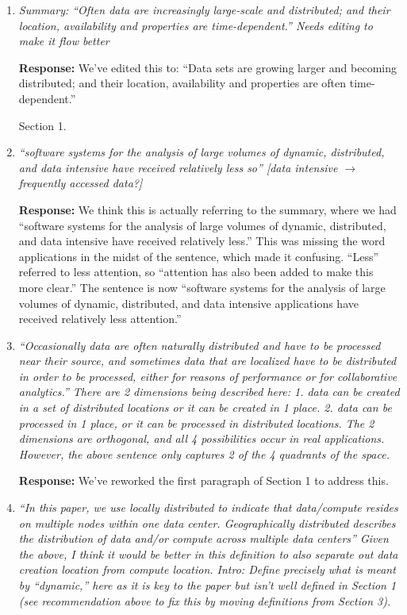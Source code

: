 \documentclass{article}
\begin{document}
\begin{enumerate}

\item \emph{Summary: ``Often data are increasingly large-scale and distributed; and their location, availability and properties are time-dependent.'' Needs editing to make it flow better}

\textbf{Response:} We've edited this to: ``Data sets are growing larger and becoming distributed; and their location, availability and properties are often time-dependent.''

\hspace{-0.7cm}Section 1.

\item \emph{``software systems for the analysis of large volumes of dynamic, distributed, and data intensive have received relatively less so'' [data intensive $\rightarrow$ frequently accessed data?]}

\textbf{Response:} We think this is actually referring to the summary, where we had ``software systems for the analysis of large volumes of dynamic, distributed, and data intensive have received relatively less.''  This was missing the word applications in the midst of the sentence, which made it confusing. ``Less'' referred to less attention, so ``attention has also been added to make this more clear.'' The sentence is now ``software systems for the analysis of large volumes of dynamic, distributed, and data intensive applications have received relatively less attention.''

\item \emph{``Occasionally data are often naturally distributed and have to be processed near their source, and sometimes data that are localized have to be distributed in order to be processed, either for reasons of performance or for collaborative analytics.'' There are 2 dimensions being described here: 1. data can be created in a set of distributed locations or it can be created in 1 place. 2. data can be processed in 1 place, or it can be processed in distributed locations. The 2 dimensions are orthogonal, and all 4 possibilities occur in real applications. However, the above sentence only captures 2 of the 4 quadrants of the space.}

\textbf{Response:} We've reworked the first paragraph of Section 1 to address this.

\item \emph{``In this paper, we use locally distributed to indicate that data/compute resides on multiple nodes within one data center. Geographically distributed describes the distribution of data and/or compute across multiple data centers'' Given the above, I think it would be better in this definition to also separate out data creation location from compute location. Intro: Define precisely what is meant by ``dynamic,'' here as it is key to the paper but isn't well defined in Section 1 (see recommendation above to fix this by moving definitions from Section 3).}


\end{enumerate}
\end{document}
